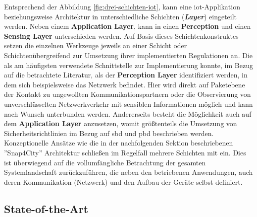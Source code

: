Entsprechend der Abbildung \ref{fig:drei-schichten-iot}, kann eine \ac{iot}-Applikation beziehungsweise Architektur in unterschiedliche Schichten (\textbf{\textit{Layer}}) eingeteilt werden. Neben einem \textbf{Application Layer}, kann in einen \textbf{Perception} und einen \textbf{Sensing Layer} unterschieden werden. 
Auf Basis dieses Schichtenkonstruktes setzen die einzelnen Werkzeuge jeweils an einer Schicht oder Schichtenübergreifend zur Umsetzung ihrer implementierten Regulationen an. Die als am häufigsten verwendete Schnittstelle zur Implementierung konnte, im Bezug auf die betrachtete Literatur, als der \textbf{Perception Layer} identifiziert werden, in dem sich beispielsweise das Netzwerk befindet. 
Hier wird direkt auf Paketebene der Kontakt zu ungewollten Kommunikationspartnern oder die Observierung von unverschlüsselten Netzwerkverkehr mit sensiblen Informationen möglich und kann nach Wunsch unterbunden werden. Andererseits besteht die Möglichkeit auch auf dem \textbf{Application Layer} anzusetzen, womit größtenteils die Umsetzung von Sicherheitsrichtlinien im Bezug auf \ac{sbd} und \ac{pbd} beschrieben werden. 
Konzeptionelle Ansätze wie die in der nachfolgenden Sektion  beschriebenen ''Snap4City'' Architektur \cite{Badii2020} schließen im Regelfall mehrere Schichten mit ein. 
Dies ist überwiegend auf die vollumfängliche Betrachtung der gesamten Systemlandschaft zurückzuführen, die neben den betriebenen Anwendungen, auch deren Kommunikation (Netzwerk) und den Aufbau der Geräte selbst definiert.

\subsection{State-of-the-Art}
\label{sec:Regulationsmöglichkeiten:ssec:State-of-the-Art}


